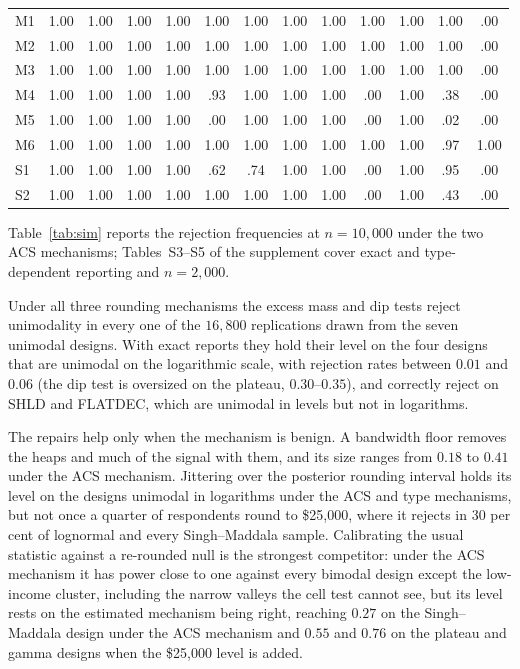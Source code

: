 \begin{table}[t]
\begin{tabular}{l*{6}{c}@{\hspace{10pt}}*{6}{c}}
M1 & 1.00 & 1.00 & 1.00 & 1.00 & 1.00 & 1.00 & 1.00 & 1.00 & 1.00 & 1.00 & 1.00 & .00 \\
M2 & 1.00 & 1.00 & 1.00 & 1.00 & 1.00 & 1.00 & 1.00 & 1.00 & 1.00 & 1.00 & 1.00 & .00 \\
M3 & 1.00 & 1.00 & 1.00 & 1.00 & 1.00 & 1.00 & 1.00 & 1.00 & 1.00 & 1.00 & 1.00 & .00 \\
M4 & 1.00 & 1.00 & 1.00 & 1.00 & .93 & 1.00 & 1.00 & 1.00 & .00 & 1.00 & .38 & .00 \\
M5 & 1.00 & 1.00 & 1.00 & 1.00 & .00 & 1.00 & 1.00 & 1.00 & .00 & 1.00 & .02 & .00 \\
M6 & 1.00 & 1.00 & 1.00 & 1.00 & 1.00 & 1.00 & 1.00 & 1.00 & 1.00 & 1.00 & .97 & 1.00 \\
S1 & 1.00 & 1.00 & 1.00 & 1.00 & .62 & .74 & 1.00 & 1.00 & .00 & 1.00 & .95 & .00 \\
S2 & 1.00 & 1.00 & 1.00 & 1.00 & 1.00 & 1.00 & 1.00 & 1.00 & .00 & 1.00 & .43 & .00 \\
\bottomrule
\end{tabular}
\end{table}

Table~\ref{tab:sim} reports the rejection frequencies at $n=10{,}000$ under the two ACS mechanisms; Tables~S3--S5 of the supplement cover exact and type-dependent reporting and $n=2{,}000$.

Under all three rounding mechanisms the excess mass and dip tests reject unimodality in every one of the $16{,}800$ replications drawn from the seven unimodal designs. With exact reports they hold their level on the four designs that are unimodal on the logarithmic scale, with rejection rates between $0.01$ and $0.06$ (the dip test is oversized on the plateau, $0.30$--$0.35$), and correctly reject on SHLD and FLATDEC, which are unimodal in levels but not in logarithms.

The repairs help only when the mechanism is benign. A bandwidth floor removes the heaps and much of the signal with them, and its size ranges from $0.18$ to $0.41$ under the ACS mechanism. Jittering over the posterior rounding interval holds its level on the designs unimodal in logarithms under the ACS and type mechanisms, but not once a quarter of respondents round to \$25{,}000, where it rejects in $30$ per cent of lognormal and every Singh--Maddala sample. Calibrating the usual statistic against a re-rounded null is the strongest competitor: under the ACS mechanism it has power close to one against every bimodal design except the low-income cluster, including the narrow valleys the cell test cannot see, but its level rests on the estimated mechanism being right, reaching $0.27$ on the Singh--Maddala design under the ACS mechanism and $0.55$ and $0.76$ on the plateau and gamma designs when the \$25{,}000 level is added.

